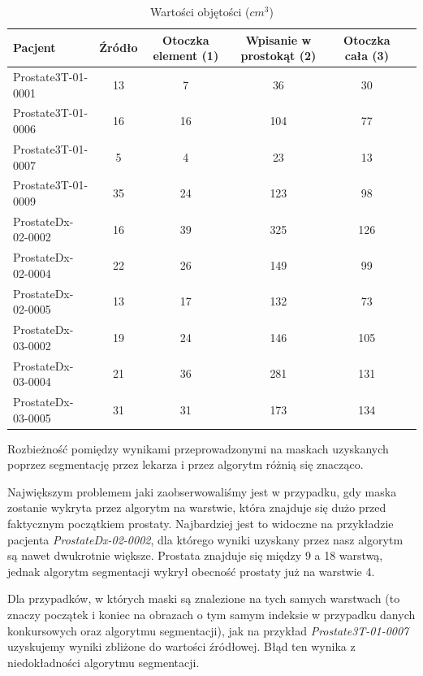 \documentclass[a4paper,11pt,twoside]{report}
\theoremstyle{definition}
\begin{document}
\begin{table}[h!]
\caption{Wartości objętości ($cm^3$)}
\centering
\begin{tabular}{|l|c|c|c|c|c|} \hline  
Pacjent             & Źródło    &  Otoczka element	(1) & Wpisanie w prostokąt (2)	& Otoczka cała (3)\\ \hline
Prostate3T-01-0001	& 13	    & 7	                    & 36	                    & 30  \\ \hline
Prostate3T-01-0006	& 16	    & 16	                & 104	                    & 77  \\ \hline
Prostate3T-01-0007	& 5	        & 4	                    & 23	                    & 13  \\ \hline
Prostate3T-01-0009	& 35	    & 24	                & 123	                    & 98  \\ \hline
ProstateDx-02-0002	& 16	    & 39	                & 325	                    & 126 \\ \hline
ProstateDx-02-0004	& 22	    & 26	                & 149	                    & 99  \\ \hline
ProstateDx-02-0005	& 13	    & 17	                & 132	                    & 73  \\ \hline
ProstateDx-03-0002	& 19	    & 24	                & 146	                    & 105 \\ \hline
ProstateDx-03-0004	& 21	    & 36	                & 281	                    & 131 \\ \hline
ProstateDx-03-0005	& 31	    & 31	                & 173	                    & 134 \\ \hline
\end{tabular}
\label{Objętości pacjenci}
\end{table}

Rozbieżność pomiędzy wynikami przeprowadzonymi na maskach uzyskanych poprzez segmentację przez lekarza i przez algorytm różnią się znacząco. 
\par
Największym problemem jaki zaobserwowaliśmy jest w przypadku, gdy maska zostanie wykryta przez algorytm na warstwie, która znajduje się dużo przed faktycznym początkiem prostaty. Najbardziej jest to widoczne na przykładzie pacjenta \textit{ProstateDx-02-0002}, dla którego wyniki uzyskany przez nasz algorytm są nawet dwukrotnie większe. Prostata znajduje się między 9 a 18 warstwą, jednak algorytm segmentacji wykrył obecność prostaty już na warstwie 4. 
\par 
Dla przypadków, w których maski są znalezione na tych samych warstwach (to znaczy początek i koniec na obrazach o tym samym indeksie w przypadku danych konkursowych oraz algorytmu segmentacji), jak na przykład \textit{Prostate3T-01-0007} uzyskujemy wyniki zbliżone do wartości źródłowej. Błąd ten wynika z niedokładności algorytmu segmentacji.
 
\end{document}
